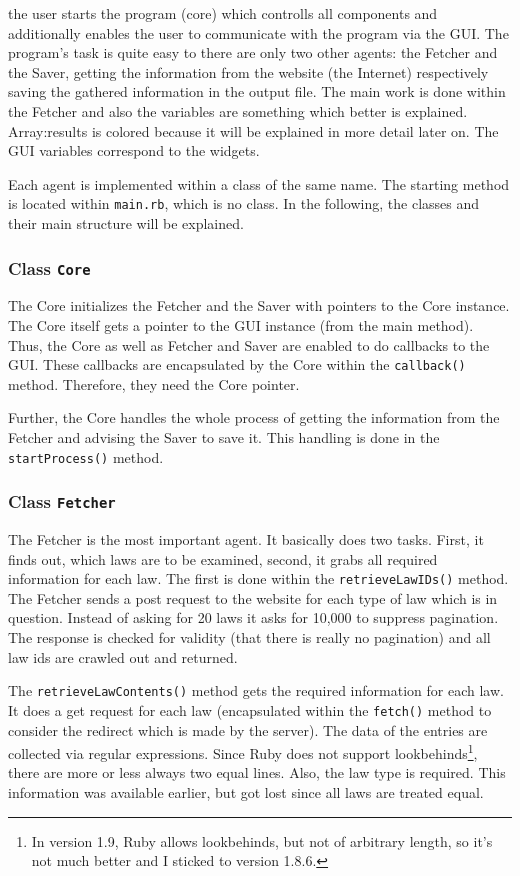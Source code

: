 \documentclass{scrartcl}
\begin{document}
the user starts the program (core) which controlls all components and additionally enables the user to communicate with the program via the GUI. The program's task is quite easy to there are only two other agents: the Fetcher and the Saver, getting the information from the website (the Internet) respectively saving the gathered information in the output file. The main work is done within the Fetcher and also the variables are something which better is explained. Array:results is colored because it will be explained in more detail later on. The GUI variables correspond to the widgets.

Each agent is implemented within a class of the same name. The starting method is located within \texttt{main.rb}, which is no class. In the following, the classes and their main structure will be explained.



\subsubsection{Class \texttt{Core}}
The Core initializes the Fetcher and the Saver with pointers to the Core instance. The Core itself gets a pointer to the GUI instance (from the main method). Thus, the Core as well as Fetcher and Saver are enabled to do callbacks to the GUI. These callbacks are encapsulated by the Core within the \texttt{callback()} method. Therefore, they need the Core pointer.

Further, the Core handles the whole process of getting the information from the Fetcher and advising the Saver to save it. This handling is done in the \texttt{startProcess()} method.



\subsubsection{Class \texttt{Fetcher}}
The Fetcher is the most important agent. It basically does two tasks. First, it finds out, which laws are to be examined, second, it grabs all required information for each law. The first is done within the \texttt{retrieveLawIDs()} method. The Fetcher sends a post request to the website for each type of law which is in question. Instead of asking for 20 laws it asks for 10,000 to suppress pagination. The response is checked for validity (that there is really no pagination) and all law ids are crawled out and returned.

The \texttt{retrieveLawContents()} method gets the required information for each law. It does a get request for each law (encapsulated within the \texttt{fetch()} method to consider the redirect which is made by the server). The data of the entries are collected via regular expressions. Since Ruby does not support lookbehinds\footnote{In version 1.9, Ruby allows lookbehinds, but not of arbitrary length, so it's not much better and I sticked to version 1.8.6.}, there are more or less always two equal lines. Also, the law type is required. This information was available earlier, but got lost since all laws are treated equal.
\end{document}
